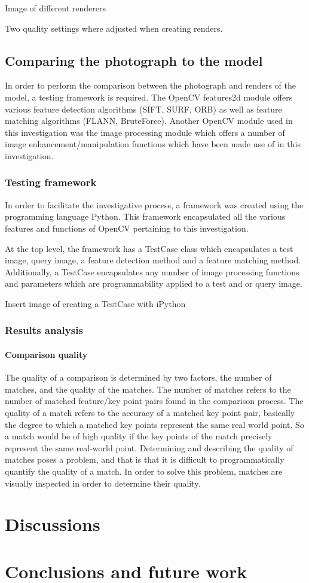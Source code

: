 \documentclass[11pt,a4paper]{report}
\begin{document}
			{{Image of different renderers}}
			
			Two quality settings where adjusted when creating renders.

	\section{Comparing the photograph to the model}
		In order to perform the comparison between the photograph and renders of the model, a testing framework is required.
		The OpenCV features2d module offers various feature detection algorithms (SIFT, SURF, ORB) as well as feature matching algorithms (FLANN, BruteForce). Another OpenCV module used in this investigation was the image processing module which offers a number of image enhancement/manipulation functions which have been made use of in this investigation.
		
		\subsection{Testing framework}
			In order to facilitate the investigative process, a framework was created using the programming language Python. This framework encapsulated all the various features and functions of OpenCV pertaining to this investigation.
			
			At the top level, the framework has a TestCase class which encapsulates a test image, query image, a feature detection method and a feature matching method. Additionally, a TestCase encapsulates any number of image processing functions and parameters which are programmability applied to a test and or query image.
			
			{{Insert image of creating a TestCase with iPython}}
			
		\subsection{Results analysis}
			\subsubsection{Comparison quality}
				The quality of a comparison is determined by two factors, the number of matches, and the quality of the matches. The number of matches refers to the number of matched feature/key point pairs found in the comparison process. The quality of a match refers to the accuracy of a matched key point pair, basically the degree to which a matched key points represent the same real world point. So a match would be of high quality if the key points of the match precisely represent the same real-world point.
				Determining and describing the quality of matches poses a problem, and that is that it is difficult to programmatically quantify the quality of a match. In order to solve this problem, matches are visually inspected in order to determine their quality.

\chapter{Discussions}

\chapter{Conclusions and future work}

\newpage
\printbibliography
\end{document}
